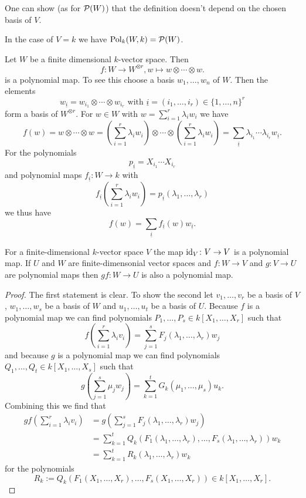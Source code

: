 \begin{rem}
 One can show (as for $\mathcal{P}(W)$) that the definition doesn’t depend on the chosen basis of $V$.
\end{rem}


\begin{rem}
 In the case of $V = k$ we have $\operatorname{Pol}_k(W,k) = \mathcal{P}(W)$.
\end{rem}


\begin{expl}
 Let $W$ be a finite dimensional $k$-vector space. Then
 \[
  f \colon W \to W^{\otimes r}, w \mapsto w \otimes \dotsb \otimes w.
 \]
 is a polynomial map. To see this choose a basis $w_1, \dotsc, w_n$ of $W$. Then the elements
 \[
  w_{\underline{i}} = w_{i_1} \otimes \dotsb \otimes w_{i_r} \text{ with } \underline{i} = (i_1, \dotsc, i_r) \in \{1, \dotsc, n\}^r
 \]
 form a basis of $W^{\otimes r}$. For $w \in W$ with $w = \sum_{i=1}^r \lambda_i w_i$ we have
 \[
  f(w)
  = w \otimes \dotsb \otimes w
  = \left( \sum_{i=1}^r \lambda_i w_i \right) \otimes \dotsb \otimes \left( \sum_{i=1}^r \lambda_i w_i \right)
  = \sum_{\underline{i}} \lambda_{i_1} \dotsm \lambda_{i_r} w_{\underline{i}}.
 \]
 For the polynomials
 \[
  p_{\underline{i}} = X_{i_1} \dotsm X_{i_r}
 \]
 and polynomial maps $f_{\underline{i}} \colon W \to k$ with
 \[
  f_{\underline{i}}\left(\sum_{i=1}^r \lambda_i w_i\right) = p_{\underline{i}}(\lambda_1, \dotsc, \lambda_r)
 \]
 we thus have
 \[
  f(w) = \sum_{\underline{i}} f_{\underline{i}}(w) w_{\underline{i}}.
 \]
\end{expl}


\begin{lem}
 For a finite-dimensional $k$-vector space $V$ the map $\operatorname{id}_V \colon V \to V$ is a polynomial map. If $U$ and $W$ are finite-dimensonial vector spaces and $f \colon W \to V$ and $g \colon V \to U$ are polynomial maps then $gf \colon W \to U$ is also a polynomial map.
\end{lem}
\begin{proof}
 The first statement is clear. To show the second let $v_1, \dotsc, v_r$ be a basis of $V$, $w_1, \dotsc, w_s$ be a basis of $W$ and $u_1, \dotsc, u_t$ be a basis of $U$. Because $f$ is a polynomial map we can find polynomials $P_1, \dotsc, P_s \in k[X_1, \dotsc, X_r]$ such that
 \[
  f\left(\sum_{i=1}^r \lambda_i v_i\right) = \sum_{j=1}^s F_j(\lambda_1, \dotsc, \lambda_r) w_j
 \]
 and because $g$ is a polynomial map we can find polynomials $Q_1, \dotsc, Q_t \in k[X_1, \dotsc, X_s]$ such that
 \[
  g\left(\sum_{j=1}^s \mu_j w_j\right) = \sum_{k=1}^t G_k(\mu_1, \dotsc, \mu_s) u_k.
 \]
 Combining this we find that
 \begin{align*}
  gf\left(\sum_{i=1}^r \lambda_i v_i\right)
  &= g\left(\sum_{j=1}^s F_j(\lambda_1, \dotsc, \lambda_r) w_j\right) \\
  &= \sum_{k=1}^t Q_k(F_1(\lambda_1, \dotsc, \lambda_r), \dotsc, F_s(\lambda_1, \dotsc, \lambda_r)) w_k \\
  &= \sum_{k=1}^t R_k(\lambda_1, \dotsc, \lambda_r) w_k
 \end{align*}
 for the polynomials
 \[
  R_k := Q_k(F_1(X_1, \dotsc, X_r), \dotsc, F_s(X_1, \dotsc, X_r)) \in k[X_1, \dotsc, X_r].
 \]
\end{proof}


